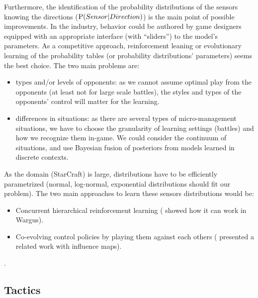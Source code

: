 Furthermore, the identification of the probability distributions of the sensors knowing the directions ($\mathrm{P}(Sensor|Direction)$) is the main point of possible improvements. In the industry, behavior could be authored by game designers equipped with an appropriate interface (with ``sliders'') to the model's parameters. As a competitive approach, reinforcement leaning or evolutionary learning of the probability tables (or probability distributions' parameters) seems the best choice. The two main problems are: 
\begin{itemize}
    \item types and/or levels of opponents: as we cannot assume optimal play from the opponents (at least not for large scale battles), the styles and types of the opponents' control will matter for the learning.
    \item differences in situations: as there are several types of micro-management situations, we have to choose the granularity of learning settings (battles) and how we recognize them in-game. We could consider the continuum of situations, and use Bayesian fusion of posteriors from models %
learned in discrete contexts.
\end{itemize}
As the domain (StarCraft) is large, distributions have to be efficiently parametrized (normal, log-normal, exponential distributions should fit our problem). The two main approaches to learn these sensors distributions would be:
\begin{itemize}
    \item Concurrent hierarchical reinforcement learning (\citep{Marthi05concurrenthierarchical} showed how it can work in Wargus).
        \item Co-evolving control policies by playing them against each others (\citep{Miles2007,Avery09} presented a related work with influence maps).
\end{itemize}.

\subsection{Tactics}

